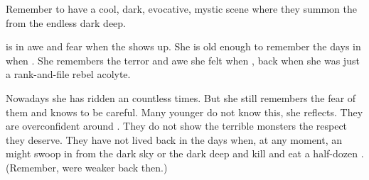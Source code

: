 Remember to have a cool, dark, evocative, mystic scene where they summon the \umbrae{} from the endless dark deep. 

\Achsah{} is in awe and fear when the \umbra{} shows up. 
She is old enough to remember the days in \Merkyrah{} when . 
She remembers the terror and awe she felt when , back when she was just a rank-and-file rebel acolyte. 

Nowadays she has ridden an \umbra{} countless times. 
But she still remembers the fear of them and knows to be careful. 
Many younger \resphain{} do not know this, she reflects. 
They are overconfident around \umbrae.
They do not show the terrible monsters the respect they deserve. 
They have not lived back in the days when, at any moment, an \umbra{} might swoop in from the dark sky or the dark deep and kill and eat a half-dozen \resphain. 
(Remember, \resphain{} were weaker back then.)
